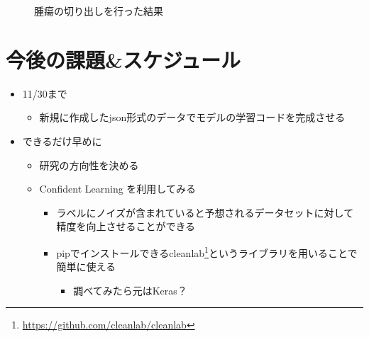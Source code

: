 \documentclass[a4j]{ujarticle}
\begin{document}
\begin{itemize}
\begin{figure}[ht]
				\caption{腫瘍の切り出しを行った結果}
			\end{figure}
		\end{itemize}

	\section{今後の課題\&スケジュール}
		\begin{itemize}
			\item 11/30まで
			\begin{itemize}
				\item 新規に作成したjson形式のデータでモデルの学習コードを完成させる
			\end{itemize}
			\item できるだけ早めに
			\begin{itemize}
				\item 研究の方向性を決める
				\item Confident Learning \cite{cleanlab} を利用してみる
                \begin{itemize}
                    \item ラベルにノイズが含まれていると予想されるデータセットに対して精度を向上させることができる
                    \item pipでインストールできるcleanlab\footnote{\url{https://github.com/cleanlab/cleanlab}}というライブラリを用いることで簡単に使える
                    \begin{itemize}
                        \item 調べてみたら元はKeras？
                    \end{itemize}
				\end{itemize}
			\end{itemize}
		\end{itemize}
\end{document}
